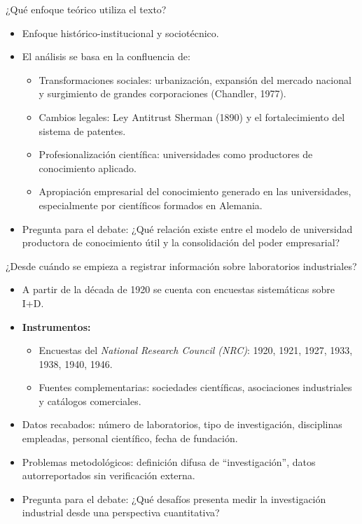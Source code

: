 \documentclass{beamer}
\begin{document}
	\begin{frame}{¿Qué enfoque teórico utiliza el texto?}
		\begin{itemize}
			\item Enfoque histórico-institucional y sociotécnico.
			\item El análisis se basa en la confluencia de:
			\begin{itemize}
				\item Transformaciones sociales: urbanización, expansión del mercado nacional y surgimiento de grandes corporaciones (Chandler, 1977).
				\item Cambios legales: Ley Antitrust Sherman (1890) y el fortalecimiento del sistema de patentes.
				\item Profesionalización científica: universidades como productores de conocimiento aplicado.
				\item Apropiación empresarial del conocimiento generado en las universidades, especialmente por científicos formados en Alemania.
			\end{itemize}
			\item Pregunta para el debate: ¿Qué relación existe entre el modelo de universidad productora de conocimiento útil y la consolidación del poder empresarial?
		\end{itemize}
	\end{frame}
	
	\begin{frame}{¿Desde cuándo se empieza a registrar información sobre laboratorios industriales?}
		\begin{itemize}
			\item A partir de la década de 1920 se cuenta con encuestas sistemáticas sobre I+D.
			\item \textbf{Instrumentos:}
			\begin{itemize}
				\item Encuestas del \textit{National Research Council (NRC)}: 1920, 1921, 1927, 1933, 1938, 1940, 1946.
				\item Fuentes complementarias: sociedades científicas, asociaciones industriales y catálogos comerciales.
			\end{itemize}
			\item Datos recabados: número de laboratorios, tipo de investigación, disciplinas empleadas, personal científico, fecha de fundación.
			\item Problemas metodológicos: definición difusa de “investigación”, datos autorreportados sin verificación externa.
			\item Pregunta para el debate: ¿Qué desafíos presenta medir la investigación industrial desde una perspectiva cuantitativa?
		\end{itemize}
	\end{frame}
	
\end{document}
